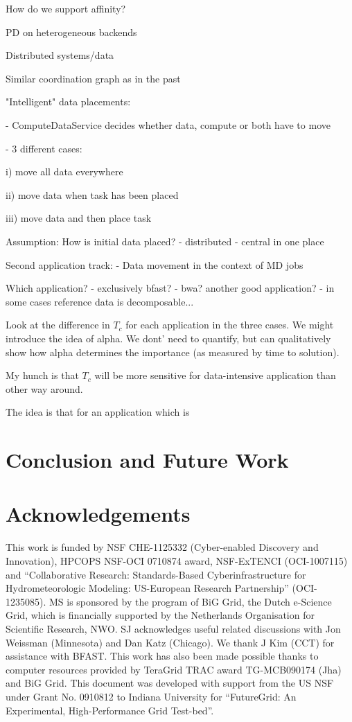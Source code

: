 \documentclass[conference]{IEEEtran}
\begin{document}
How do we support affinity?

PD on heterogeneous backends

Distributed systems/data

Similar coordination graph as in the past

"Intelligent" data placements:

- ComputeDataService decides whether data, compute or both have to move

- 3 different cases:

i) move all data everywhere

ii) move data when task has been placed

iii) move data and then place task

Assumption:
How is initial data placed?
- distributed
- central in one place

Second application track:
- Data movement in the context of MD jobs

Which application?
- exclusively bfast?
- bwa? another good application?
- in some cases reference data is decomposable...

Look at the difference in $T_c$ for each application in the three
cases. We might introduce the idea of alpha. We dont' need to
quantify, but can qualitatively show how alpha determines the
importance (as measured by time to solution). 

My hunch is that $T_c$ will be more sensitive for data-intensive
application than other way around.

The idea is that for an application which is



\section{Conclusion and Future Work}

\section*{Acknowledgements}
\footnotesize \footnotesize{This work is funded by NSF CHE-1125332
  (Cyber-enabled Discovery and Innovation), HPCOPS NSF-OCI 0710874
  award, NSF-ExTENCI (OCI-1007115) and ``Collaborative Research:
  Standards-Based Cyberinfrastructure for Hydrometeorologic Modeling:
  US-European Research Partnership'' (OCI-1235085).  MS is sponsored
  by the program of BiG Grid, the Dutch e-Science Grid, which is
  financially supported by the Netherlands Organisation for Scientific
  Research, NWO. SJ acknowledges useful related discussions with Jon
  Weissman (Minnesota) and Dan Katz (Chicago). We thank J Kim (CCT)
  for assistance with BFAST.  This work has also been made possible
  thanks to computer resources provided by TeraGrid TRAC award
  TG-MCB090174 (Jha) and BiG Grid.  This document was developed with
  support from the US NSF under Grant No. 0910812 to Indiana
  University for ``FutureGrid: An Experimental, High-Performance Grid
  Test-bed''.}

  


\end{document}
